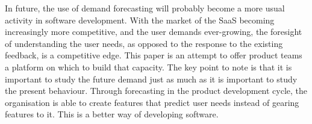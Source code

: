In future, the use of demand forecasting will probably become a more usual activity in software development. With the market of the SaaS becoming increasingly more competitive, and the user demands ever-growing, the foresight of understanding the user needs, as opposed to the response to the existing feedback, is a competitive edge. This paper is an attempt to offer product teams a platform on which to build that capacity. The key point to note is that it is important to study the future demand just as much as it is important to study the present behaviour. Through forecasting in the product development cycle, the organisation is able to create features that predict user needs instead of gearing features to it. This is a better way of developing software.
